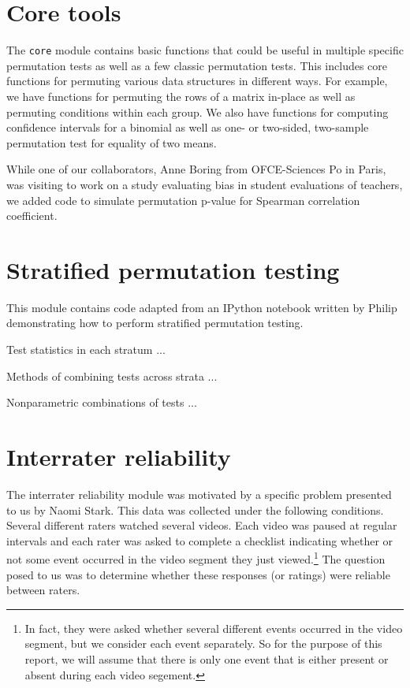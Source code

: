 \section{Core tools}

The \texttt{core} module contains basic functions that could be useful in
multiple specific permutation tests as well as a few classic permutation tests.
This includes core functions for permuting various data structures in different
ways.  For example, we have functions for permuting the rows of a matrix
in-place as well as permuting conditions within each group. We also have
functions for computing confidence intervals for a binomial as well as
one- or two-sided, two-sample permutation test for equality of two means.

While one of our collaborators, Anne Boring from OFCE-Sciences Po in Paris, was
visiting to work on a study evaluating bias in student evaluations of teachers,
we added code to simulate permutation p-value for Spearman correlation
coefficient.\cite{boring2015}

\section{Stratified permutation testing}

This module contains code adapted from an IPython notebook written by
Philip demonstrating how to perform stratified permutation testing.

Test statistics in each stratum ...

Methods of combining tests across strata ...

Nonparametric combinations of tests ...

\section{\label{sec:irr}Interrater reliability}

The interrater reliability module was motivated by a specific problem presented
to us by Naomi Stark.  This data was collected under the following conditions.
Several different raters watched several videos.  Each video was paused at
regular intervals and each rater was asked to complete a checklist indicating
whether or not some event occurred in the video segment they just
viewed.\footnote{In fact, they were asked whether several different events
occurred in the video segment, but we consider each event separately.  So for
the purpose of this report, we will assume that there is only one event that is
either present or absent during each video segement.} The question posed to us
was to determine whether these responses (or ratings) were reliable between
raters. 

